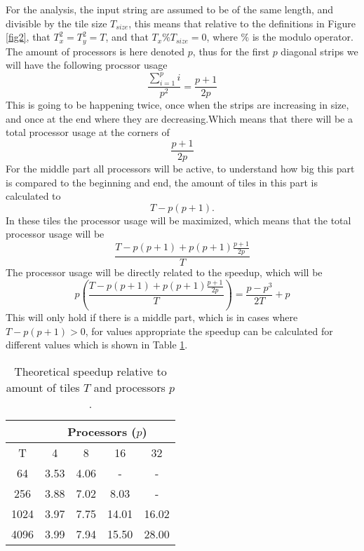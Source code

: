 For the analysis, the input string are assumed to be of the same length, and divisible by the tile size $T_{size}$, this means that relative to the definitions in Figure \ref{fig2}, that $T_x^2 = T_y^2 = T$, and that $T_x \% T_{size} = 0$, where $\%$ is the modulo operator. The amount of processors is here denoted $p$, thus for the first $p$ diagonal strips we will have the following procssor usage
$$
\frac{\sum_{i=1}^p i}{p^2} = \frac{p+1}{2p}
$$
This is going to be happening twice, once when the strips are increasing in size, and once at the end where they are decreasing.Which means that there will be a total processor usage at the corners of
$$
\frac{p+1}{2p}
$$
For the middle part all processors will be active, to understand how big this part is compared to the beginning and end, the amount of tiles in this part is calculated to
$$
  T - p(p+1).
$$
In these tiles the processor usage will be maximized, which means that the total processor usage will be
$$
\frac{T - p(p+1) + p(p+1)\frac{p+1}{2p}}{T}
$$
The processor usage will be directly related to the speedup, which will be
$$
p \left(\frac{T - p(p+1) + p(p+1)\frac{p+1}{2p}}{T}\right) = \frac{p - p^3}{2T} + p
$$
This will only hold if there is a middle part, which is in cases where $T - p(p+1) > 0$, for values appropriate the speedup can be calculated for different values which is shown in Table \ref{tab1}.
\begin{table}[H]
  \center
  \begin{tabular}{|c||c|c|c|c|}
  \hline
          & \multicolumn{4}{c|}{Processors ($p$)}\\
  \hline
     T    & 4    & 8     & 16    & 32\\
  \hline
     64   & 3.53 & 4.06  & -     & - \\
  \hline
     256  & 3.88 & 7.02  & 8.03  & - \\
  \hline
     1024 & 3.97 & 7.75  & 14.01 & 16.02 \\
  \hline
     4096 & 3.99 & 7.94  & 15.50 & 28.00\\
  \hline
  \end{tabular}
  \caption{Theoretical speedup relative to amount of tiles $T$ and processors $p$.}
  \label{tab1}
\end{table}
